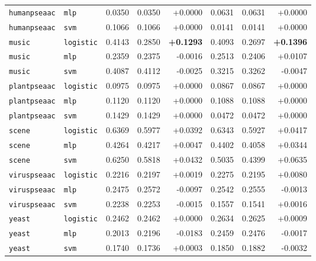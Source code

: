 \documentclass[11pt,a4paper]{article}
\begin{document}
\begin{table}[htbp]
{\begin{tabular}{l l r r r r r r}
\texttt{humanpseaac} & \texttt{mlp} & 0.0350 & 0.0350 & +0.0000 & 0.0631 & 0.0631 & +0.0000 \\
\texttt{humanpseaac} & \texttt{svm} & 0.1066 & 0.1066 & +0.0000 & 0.0141 & 0.0141 & +0.0000 \\
\midrule
\texttt{music} & \texttt{logistic} & 0.4143 & 0.2850 & \textbf{+0.1293} & 0.4093 & 0.2697 & \textbf{+0.1396} \\
\texttt{music} & \texttt{mlp} & 0.2359 & 0.2375 & -0.0016 & 0.2513 & 0.2406 & +0.0107 \\
\texttt{music} & \texttt{svm} & 0.4087 & 0.4112 & -0.0025 & 0.3215 & 0.3262 & -0.0047 \\
\midrule
\texttt{plantpseaac} & \texttt{logistic} & 0.0975 & 0.0975 & +0.0000 & 0.0867 & 0.0867 & +0.0000 \\
\texttt{plantpseaac} & \texttt{mlp} & 0.1120 & 0.1120 & +0.0000 & 0.1088 & 0.1088 & +0.0000 \\
\texttt{plantpseaac} & \texttt{svm} & 0.1429 & 0.1429 & +0.0000 & 0.0472 & 0.0472 & +0.0000 \\
\midrule
\texttt{scene} & \texttt{logistic} & 0.6369 & 0.5977 & +0.0392 & 0.6343 & 0.5927 & +0.0417 \\
\texttt{scene} & \texttt{mlp} & 0.4264 & 0.4217 & +0.0047 & 0.4402 & 0.4058 & +0.0344 \\
\texttt{scene} & \texttt{svm} & 0.6250 & 0.5818 & +0.0432 & 0.5035 & 0.4399 & +0.0635 \\
\midrule
\texttt{viruspseaac} & \texttt{logistic} & 0.2216 & 0.2197 & +0.0019 & 0.2275 & 0.2195 & +0.0080 \\
\texttt{viruspseaac} & \texttt{mlp} & 0.2475 & 0.2572 & -0.0097 & 0.2542 & 0.2555 & -0.0013 \\
\texttt{viruspseaac} & \texttt{svm} & 0.2238 & 0.2253 & -0.0015 & 0.1557 & 0.1541 & +0.0016 \\
\midrule
\texttt{yeast} & \texttt{logistic} & 0.2462 & 0.2462 & +0.0000 & 0.2634 & 0.2625 & +0.0009 \\
\texttt{yeast} & \texttt{mlp} & 0.2013 & 0.2196 & -0.0183 & 0.2459 & 0.2476 & -0.0017 \\
\texttt{yeast} & \texttt{svm} & 0.1740 & 0.1736 & +0.0003 & 0.1850 & 0.1882 & -0.0032 \\
\bottomrule
\end{tabular}%
}
\end{table}
\end{document}
